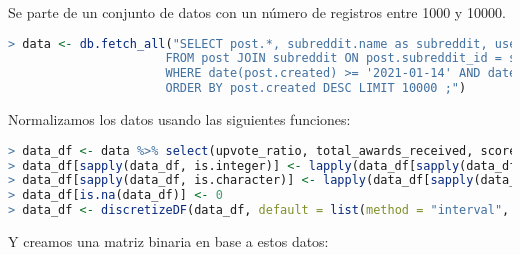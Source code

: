 \documentclass[../../main.tex]{subfiles}
\begin{document}
Se parte de un conjunto de datos con un número de registros entre 1000 y 10000.  \\

\begin{lstlisting}[language=R]
> data <- db.fetch_all("SELECT post.*, subreddit.name as subreddit, user.name as username 
					  FROM post JOIN subreddit ON post.subreddit_id = subreddit.id JOIN user ON post.user_id = user.id  
					  WHERE date(post.created) >= '2021-01-14' AND date(post.created) <= '2021-09-12' 
					  ORDER BY post.created DESC LIMIT 10000 ;")
\end{lstlisting}

\vskip 0.2in

Normalizamos los datos usando las siguientes funciones:

\begin{lstlisting}[language=R]
> data_df <- data %>% select(upvote_ratio, total_awards_received, score, domain, subreddit)
> data_df[sapply(data_df, is.integer)] <- lapply(data_df[sapply(data_df, is.integer)], as.numeric)
> data_df[sapply(data_df, is.character)] <- lapply(data_df[sapply(data_df, is.character)], as.factor)
> data_df[is.na(data_df)] <- 0
> data_df <- discretizeDF(data_df, default = list(method = "interval", breaks = 3, labels = c("Low", "Medium", "High")))

\end{lstlisting}

\vskip 0.2in

Y creamos una matriz binaria en base a estos datos:
\end{document}
